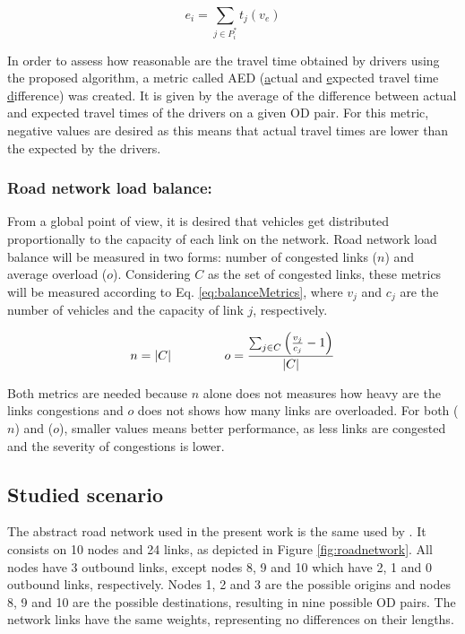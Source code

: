 \documentclass[12pt]{llncs}
\newcommand{\optRoute}[1]{\ensuremath{P_#1^*}}	%
\newcommand{\travTime}{\ensuremath{t_j}} 	%
\newcommand{\linkCap}{\ensuremath{c_j}}		%
\newcommand{\veh}{\ensuremath{v}}		%
\newcommand{\ett}[1]{\ensuremath{e_#1}}		%
\newcommand{\expVeh}{\ensuremath{v_e}}		%
\newcommand{\congRoads}{\ensuremath{C}}		%
\newcommand{\numCong}{\ensuremath{n}}		%
\newcommand{\overLoadFactor}{\ensuremath{o}}	%
\begin{document}
\begin{equation}
\label{eq:ett}
\ett{i} = \sum_{j \in \optRoute{i}}\travTime(\expVeh)
\end{equation}

In order to assess how reasonable are the travel time obtained by drivers using the proposed algorithm, a metric called AED (\underline{a}ctual and \underline{e}xpected travel time \underline{d}ifference) was created. It is given by the average of the difference between actual and expected travel times of the drivers on a given OD pair. For this metric, negative values are desired as this means that actual travel times are lower than the expected by the drivers.

\subsubsection{Road network load balance:}

From a global point of view, it is desired that vehicles get distributed proportionally to the capacity of each link on the network. Road network load balance will be measured in two forms: number of congested links ($n$) and average overload ($o$). Considering $C$ as the set of congested links, these metrics will be measured according to Eq. \eqref{eq:balanceMetrics}, where $\veh_j$ and $\linkCap$ are the number of vehicles and the capacity of link $j$, respectively. 

\begin{equation}
\label{eq:balanceMetrics}
\numCong = |\congRoads| \hspace{1.5cm}  \overLoadFactor = \frac{ \sum_{\substack{j \in \congRoads}} \left(\frac{\veh_j}{\linkCap} -1 \right)}{|C|}
\end{equation}

Both metrics are needed because $n$ alone does not measures how heavy are the links congestions and $o$ does not shows how many links are overloaded. For both ($n$) and ($o$), smaller values means better performance, as less links are congested and the severity of congestions is lower.

\subsection{Studied scenario} 

The abstract road network used in the present work is the same used by \cite{Galib&Moser2011}. It consists on 10 nodes and 24 links, as depicted in Figure \ref{fig:roadnetwork}. All nodes have 3 outbound links, except nodes 8, 9 and 10 which have 2, 1 and 0 outbound links, respectively. Nodes 1, 2 and 3 are the possible origins and nodes 8, 9 and 10 are the possible destinations, resulting in nine possible OD pairs. The network links have the same weights, representing no differences on their lengths.
\end{document}
